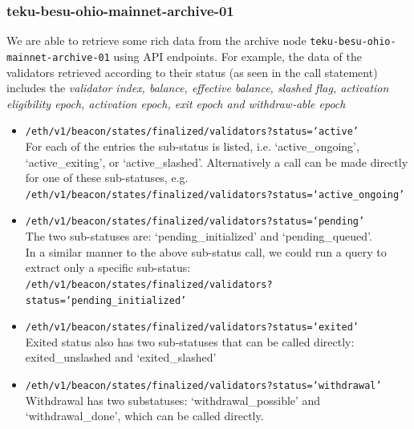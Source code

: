 \documentclass[UTF8]{article}
\begin{document}
\clearpage
\subsubsection*{teku-besu-ohio-mainnet-archive-01}

We are able to retrieve some rich data from the archive node \texttt{teku-besu-ohio-mainnet-archive-01} using API endpoints. For example, the data of the validators retrieved according to their status (as seen in the call statement)  includes the \textit{validator index, balance, effective balance, slashed flag, activation eligibility epoch, activation epoch, exit epoch and withdraw-able epoch}
\begin{itemize}
\item \texttt{/eth/v1/beacon/states/finalized/validators?status=`active'} \\
For each of the entries the sub-status is listed, i.e. `active\_ongoing', `active\_exiting', or `active\_slashed'. Alternatively a call can be made directly for one of these sub-statuses, e.g. \\
 \texttt{/eth/v1/beacon/states/finalized/validators?status=`active\_ongoing'}
\item \texttt{/eth/v1/beacon/states/finalized/validators?status=`pending'}\\
The two sub-statuses are: `pending\_initialized' and `pending\_queued'. \\
In a similar manner to the above sub-status call, we could run a query to extract only a specific sub-status:\\
\texttt{/eth/v1/beacon/states/finalized/validators?status=`pending\_initialized'}
\item \texttt{/eth/v1/beacon/states/finalized/validators?status=`exited'} \\
Exited status also has two sub-statuses that can be called directly: exited\_unslashed and `exited\_slashed'
\item \texttt{/eth/v1/beacon/states/finalized/validators?status=`withdrawal'} \\
Withdrawal has two substatuses: `withdrawal\_possible' and `withdrawal\_done', which can be called directly.
\end{itemize}
\clearpage
\end{document}
